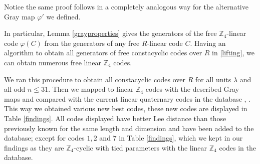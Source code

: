 \documentclass[a4paper, 12pt]{amsart}
\theoremstyle{definition}
\newcommand{\Z}{{\mathbb Z}}
\numberwithin{equation}{section}
\numberwithin{table}{section}
\begin{document}
Notice the same proof follows in a completely analogous way for the alternative Gray map $\varphi'$ we defined.

In particular, Lemma \ref{grayproperties} gives the generators of the free $\Z_4$-linear code $\varphi(C)$ from the generators of any free $R$-linear code $C$. Having an algorithm to obtain all generators of free constacyclic codes over $R$ in \ref{lifting}, we can obtain numerous free linear $\Z_4$ codes.

We ran this procedure to obtain all constacyclic codes over $R$ for all units $\lambda$ and all odd $n \leq 31$. Then we mapped to linear $\Z_4$ codes with the described Gray maps and compared with the current linear quaternary codes in the database \cite{Aydin2023}, \cite{Z4database}. This way we obtained various new best codes, these new codes are displayed in Table \ref{findings}. All codes displayed have better Lee distance than those previously known for the same length and dimension and have been added to the database; except for codes $1,2$ and $7$ in Table \ref{findings}, which we kept in our findings as they are $\Z_4$-cyclic with tied parameters with the linear $\Z_4$ codes in the database.
\end{document}
